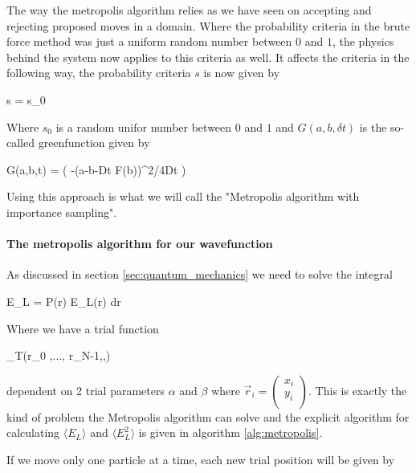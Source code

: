The way the metropolis algorithm relies as we have seen on accepting and rejecting proposed moves in a domain. 
Where the probability criteria in the brute force method was just a uniform random number between $0$ and $1$, the physics behind the system now applies to this criteria as well. 
It affects the criteria in the following way, the probability criteria $s$ is now given by 

\eqs
s =  s_0
\eqf

Where $s_0$ is a random unifor number between $0$ and $1$ and $G(a,b,\delta t)$ is the so-called greenfunction given by 

\eqs
G(a,b,\delta t) =  \exp \left (  -(a-b-D\delta t F(b))^2/4D\delta t \right )
\eqf

Using this approach is what we will call the "Metropolis algorithm with importance sampling".


\paragraph{The metropolis algorithm for our wavefunction}
As discussed in section \ref{sec:quantum_mechanics} we need to solve the integral 

\eqs \langle E_L \rangle = \int P(\vec r) E_L(\vec r) d\vec r \eqf

Where we have a trial function 

\eqs \Psi_T(\vec r_0 ,..., \vec r_{N-1},\alpha,\beta) \eqf

dependent on 2 trial parameters $\alpha$ and $\beta$
where $\vec r_i = \left ( \begin{matrix} x_i \\ y_i \\ \end{matrix} \right )$.
This is exactly the kind of problem the Metropolis algorithm can solve and the explicit algorithm for calculating $\langle E_L \rangle$ and $\langle E_L^2 \rangle$ is given in algorithm \ref{alg:metropolis}.



If we move only one particle at a time, each new trial position will be given by 

\eqs
{}
\eqf

